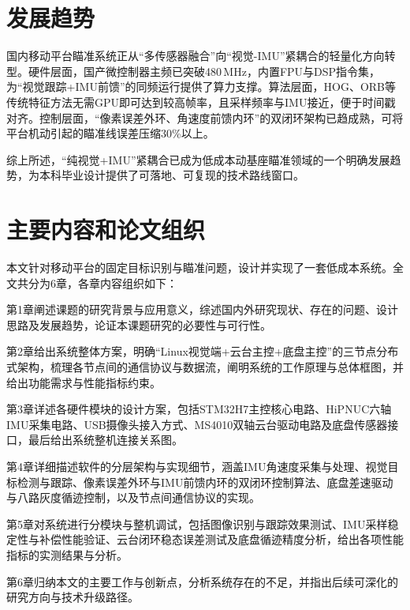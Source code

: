 \section{发展趋势}
国内移动平台瞄准系统正从``多传感器融合''向``视觉-IMU''紧耦合的轻量化方向转型。硬件层面，国产微控制器主频已突破480\,MHz，内置FPU与DSP指令集，为``视觉跟踪+IMU前馈''的同频运行提供了算力支撑。算法层面，HOG、ORB等传统特征方法无需GPU即可达到较高帧率，且采样频率与IMU接近，便于时间戳对齐。控制层面，``像素误差外环、角速度前馈内环''的双闭环架构已趋成熟，可将平台机动引起的瞄准线误差压缩30\%以上。

综上所述，``纯视觉+IMU''紧耦合已成为低成本动基座瞄准领域的一个明确发展趋势，为本科毕业设计提供了可落地、可复现的技术路线窗口。
\section{主要内容和论文组织}
本文针对移动平台的固定目标识别与瞄准问题，设计并实现了一套低成本系统。全文共分为6章，各章内容组织如下：

第1章阐述课题的研究背景与应用意义，综述国内外研究现状、存在的问题、设计思路及发展趋势，论证本课题研究的必要性与可行性。\par
第2章给出系统整体方案，明确``Linux视觉端+云台主控+底盘主控''的三节点分布式架构，梳理各节点间的通信协议与数据流，阐明系统的工作原理与总体框图，并给出功能需求与性能指标约束。\par
第3章详述各硬件模块的设计方案，包括STM32H7主控核心电路、HiPNUC六轴IMU采集电路、USB摄像头接入方式、MS4010双轴云台驱动电路及底盘传感器接口，最后给出系统整机连接关系图。\par
第4章详细描述软件的分层架构与实现细节，涵盖IMU角速度采集与处理、视觉目标检测与跟踪、像素误差外环与IMU前馈内环的双闭环控制算法、底盘差速驱动与八路灰度循迹控制，以及节点间通信协议的实现。\par
第5章对系统进行分模块与整机调试，包括图像识别与跟踪效果测试、IMU采样稳定性与补偿性能验证、云台闭环稳态误差测试及底盘循迹精度分析，给出各项性能指标的实测结果与分析。\par
第6章归纳本文的主要工作与创新点，分析系统存在的不足，并指出后续可深化的研究方向与技术升级路径。


